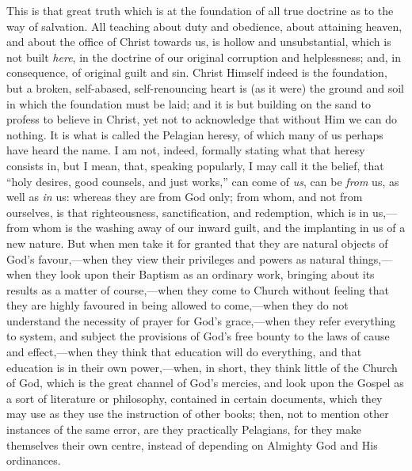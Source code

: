 This is that great truth which is at the foundation of all true
doctrine as to the way of salvation. All teaching about duty and
obedience, about attaining heaven, and about the office of Christ
towards us, is hollow and unsubstantial, which is not built \emph{here},
in the doctrine of our original corruption and helplessness; and, in
consequence, of original guilt and sin. Christ Himself indeed is the
foundation, but a broken, self-abased, self-renouncing heart is (as it
were) the ground and soil in which the foundation must be laid; and it
is but building on the sand to profess to believe in Christ, yet not
to acknowledge that without Him we can do nothing. It is what is
called the Pelagian heresy, of which many of us perhaps have heard the
name. I am not, indeed, formally stating what that heresy consists in,
but I mean, that, speaking popularly, I may call it the belief, that
``holy desires, good counsels, and just works,'' can come of \emph{us},
can be \emph{from} us, as well as \emph{in} us: whereas they are from
God only; from whom, and not from ourselves, is that righteousness,
sanctification, and redemption, which is in us,—from whom is the
washing away of our inward guilt, and the implanting in us of a new
nature. But when men take it for granted that they are natural objects
of God's favour,—when they view their privileges and powers as
natural things,—when they look upon their Baptism as an ordinary
work, bringing about its results as a matter of course,—when they
come to Church without feeling that they are highly favoured in being
allowed to come,—when they do not understand the necessity of prayer
for God's grace,—when they refer everything to system, and subject
the provisions of God's free bounty to the laws of cause and effect,—when
they think that education will do everything, and that education is in
their own power,—when, in short, they think little of the Church of
God, which is the great channel of God's mercies, and look upon the
Gospel as a sort of literature or philosophy, contained in certain
documents, which they may use as they use the instruction of other
books; then, not to mention other instances of the same error, are
they practically Pelagians, for they make themselves their own centre,
instead of depending on Almighty God and His ordinances.

